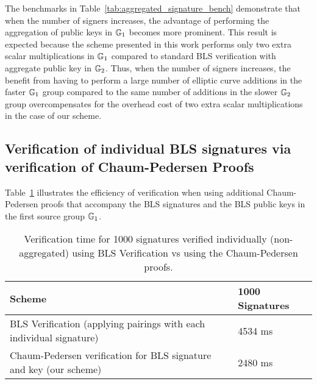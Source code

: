The benchmarks in Table~\ref{tab:aggregated_signature_bench} demonstrate that when the number of signers increases, the advantage of performing the aggregation of public keys in $\mathbb{G}_{1}$ becomes more prominent. This result is expected because the scheme presented in this work performs only two extra scalar multiplications in $\mathbb{G}_{1}$ compared to standard BLS verification with aggregate public key in $\mathbb{G}_{2}$. %
Thus, when the number of signers increases, the benefit from having to perform a large number of elliptic curve additions in the faster $\mathbb{G}_{1}$ group compared to the same number of 
additions in the slower $\mathbb{G}_{2}$ group overcompensates for the overhead cost of two extra scalar multiplications in the case of our scheme. 

\subsection{Verification of individual  BLS signatures via verification of Chaum-Pedersen Proofs}
\label{sec:benchmark_chaum_pederson_verify}

Table~\ref{tab:individual_signature_bench} illustrates the efficiency of verification when using additional Chaum-Pedersen proofs that accompany the BLS signatures and the BLS public keys in the first source group $\mathbb{G}_{1}$.

\begin{table}[h!]
\begin{tabular}{| l | l |}

\hline

Scheme & \textbf{1000 Signatures} 	 \\
\hline
BLS Verification (applying pairings with each individual signature)   & 4534 ms \\
\hline
Chaum-Pedersen verification for BLS signature and key (our scheme)   & 2480 ms \\
\hline
\end{tabular}
\caption{Verification time for 1000 signatures verified individually (non-aggregated) using  BLS Verification vs using the Chaum-Pedersen proofs.}
\label{tab:individual_signature_bench}
\end{table}

